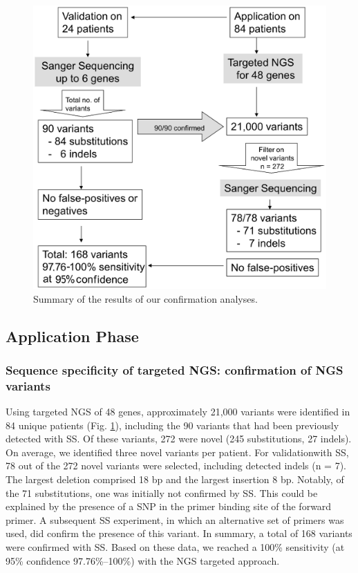 \begin{figure}[!ht]
	\includegraphics[width=1.0\linewidth]{img/SNP_Indel_Fig3}
	\caption[Summary of the results of our confirmation analyses]{Summary of the results of our confirmation analyses.}
\label{fig:SNP_Indel_Fig3}
\end{figure}

\subsection{Application Phase}

\subsubsection{Sequence specificity of targeted NGS: confirmation of NGS variants}
Using targeted NGS of 48 genes, approximately 21,000 variants were identified in 84 unique patients (Fig. \ref{fig:SNP_Indel_Fig3}), including the 90 variants that had been previously detected with SS. 
Of these variants, 272 were novel (245 substitutions, 27 indels). 
On average, we identified three novel variants per patient. 
For validationwith SS, 78 out of the 272 novel variants were selected, including detected indels (n = 7). 
The largest deletion comprised 18 bp and the largest insertion 8 bp. 
Notably, of the 71 substitutions, one was initially not confirmed by SS. 
This could be explained by the presence of a SNP in the primer binding site of the forward primer. 
A subsequent SS experiment, in which an alternative set of primers was used, did confirm the presence of this variant. 
In summary, a total of 168 variants were confirmed with SS. 
Based on these data, we reached a 100\% sensitivity (at 95\% confidence 97.76\%–100\%) \cite{Waerden_1957} with the NGS targeted approach.

